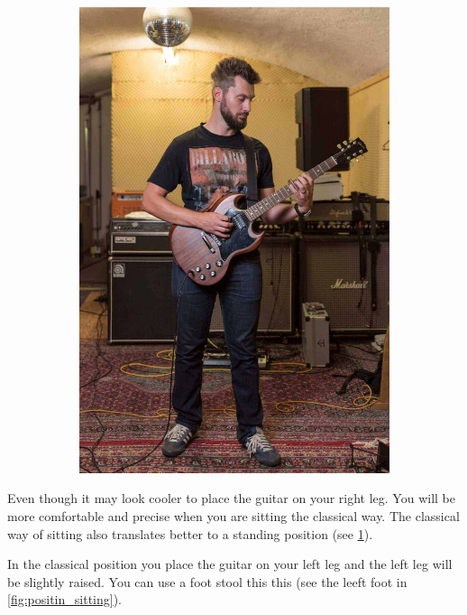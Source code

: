 \begin{figure}[h]
\begin{subfigure}[b]{0.45\textwidth}
    \includegraphics[width=\textwidth]{../Images/Letty_Guitar-Shooting_standing.jpg}
    \caption{}
    \label{fig:positin_standing}
  \end{subfigure}
  \caption{\cite{SitStandPosition}}
  \label{fig:positin}
\end{figure}


Even though it may look cooler to place the guitar on your right leg. You will be more comfortable and precise when you are sitting the classical way. The classical way of sitting also translates better to a standing position (see \ref{fig:positin_standing}).

In the classical position you place the guitar on your left leg and the left leg will be slightly raised. You can use a foot stool this this (see the leeft foot in \ref{fig:positin_sitting}).